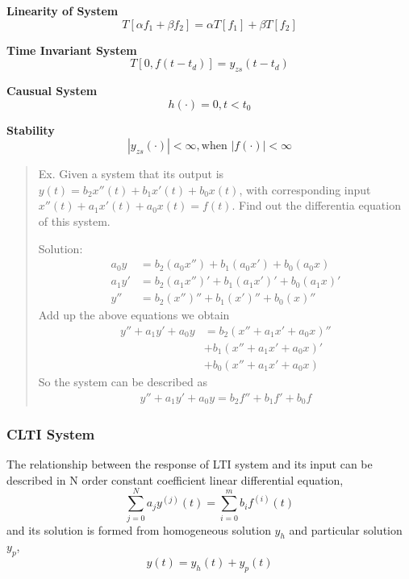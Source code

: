  {\bf Linearity of System}
 \[ T[\alpha f_1 + \beta f_2] = \alpha T[f_1] + \beta T[f_2] \]

 {\bf Time Invariant System}
 \[ T[{0}, f(t-t_d)] = y_{zs} (t-t_d) \]

 {\bf Causual System}
 \[ h(\cdot) = 0, t < t_0 \]

 {\bf Stability}
 \[ |y_{zs}(\cdot)| < \infty, \text{when } |f(\cdot)| < \infty \]

 \begin{quote}  
	 Ex. Given a system that its output is $y(t) = b_2x''(t)+b_1x'(t)+b_0x(t)$,
	 with corresponding input $x''(t)+a_1x'(t)+a_0x(t) = f(t)$. Find out the differentia
	 equation of this system.
	 
	 Solution:
 \begin{align*}
	 a_0 y &= b_2(a_0 x'') +b_1(a_0 x') + b_0(a_0 x) \\
	 a_1 y' &= b_2(a_1 x'')' +b_1(a_1 x')' +b_0(a_1 x)' \\
	 y'' &= b_2(x'')'' + b_1(x')'' + b_0(x)'' 
 \end{align*}
	 Add up the above equations we obtain
 \begin{align*}
	 y'' + a_1 y' + a_0 y & = b_2(x''+a_1 x'+a_0 x)'' \\
						  & + b_1(x'' + a_1 x' + a_0 x)' \\
						  & + b_0( x'' + a_1 x' + a_0 x)
 \end{align*}
 	So the system can be described as
	\begin{align*}
		y''+a_1 y' + a_0 y = b_2 f'' + b_1 f' + b_0 f
	\end{align*}
 	 
 \end{quote}


 \subsubsection{CLTI System}

 The relationship between the response of LTI system and its input can be described
 in N order constant coefficient linear differential equation,
 \[ \sum_{j=0}^N a_j y^{(j)}(t) = \sum_{i=0}^m b_i f^{(i)}(t) \]
 and its solution is formed from homogeneous solution $y_h$ and particular solution $y_p$,
 \[ y(t) = y_h(t) + y_p(t) \]

